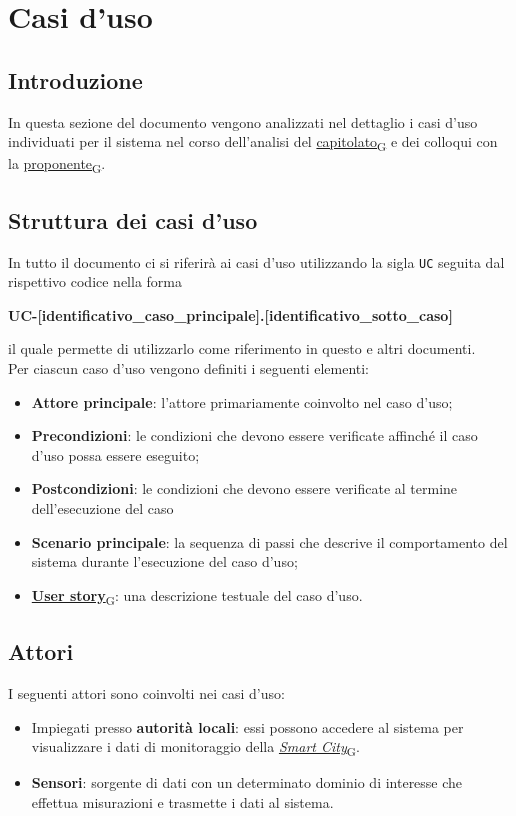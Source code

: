 \section{Casi d'uso}
\subsection{Introduzione}
In questa sezione del documento vengono analizzati nel dettaglio i casi d'uso individuati per il sistema
nel corso dell'analisi del \href{https://7last.github.io/docs/rtb/documentazione-interna/glossario\#capitolato}{capitolato\textsubscript{G}} e dei colloqui con la \href{https://7last.github.io/docs/rtb/documentazione-interna/glossario\#proponente}{proponente\textsubscript{G}}.

\subsection{Struttura dei casi d'uso}
In tutto il documento ci si riferirà ai casi d'uso utilizzando la sigla \texttt{UC} seguita dal rispettivo codice nella forma
\begin{center}
	\textbf{UC-[identificativo\_caso\_principale].[identificativo\_sotto\_caso]}
\end{center}
il quale permette di utilizzarlo come riferimento in questo e altri documenti.\\
Per ciascun caso d'uso vengono definiti i seguenti elementi:
\begin{itemize}
	\item \textbf{Attore principale}: l'attore primariamente coinvolto nel caso d'uso;
	\item \textbf{Precondizioni}: le condizioni che devono essere verificate affinché il caso d'uso possa essere
	      eseguito;
	\item \textbf{Postcondizioni}: le condizioni che devono essere verificate al termine dell'esecuzione del caso
	\item \textbf{Scenario principale}: la sequenza di passi che descrive il comportamento del sistema durante
	      l'esecuzione del caso d'uso;
	\item \href{https://7last.github.io/docs/rtb/documentazione-interna/glossario\#user-story}{\textbf{User story}\textsubscript{G}}: una descrizione testuale del caso d'uso.
\end{itemize}


\subsection{Attori}
I seguenti attori sono coinvolti nei casi d'uso:
\begin{itemize}
	\item Impiegati presso \textbf{autorità locali}: essi possono accedere al sistema per visualizzare i dati di
	      monitoraggio della \href{https://7last.github.io/docs/rtb/documentazione-interna/glossario\#smart-city}{\textit{Smart City}\textsubscript{G}}.
	\item \textbf{Sensori}: sorgente di dati con un determinato dominio di interesse che effettua misurazioni
	      e trasmette i dati al sistema.
\end{itemize}

